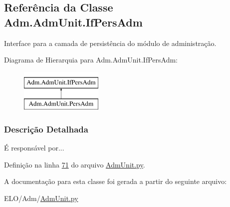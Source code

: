 \hypertarget{classAdm_1_1AdmUnit_1_1IfPersAdm}{\subsection{Referência da Classe Adm.\-Adm\-Unit.\-If\-Pers\-Adm}
\label{classAdm_1_1AdmUnit_1_1IfPersAdm}
}


Interface para a camada de persistência do módulo de administração.  


Diagrama de Hierarquia para Adm.\-Adm\-Unit.\-If\-Pers\-Adm\-:\begin{figure}[H]
\begin{center}
\leavevmode
\includegraphics[height=2.000000cm]{d0/dce/classAdm_1_1AdmUnit_1_1IfPersAdm}
\end{center}
\end{figure}


\subsubsection{Descrição Detalhada}
É responsável por... 

Definição na linha \hyperlink{AdmUnit_8py_source_l00071}{71} do arquivo \hyperlink{AdmUnit_8py_source}{Adm\-Unit.\-py}.



A documentação para esta classe foi gerada a partir do seguinte arquivo\-:\begin{DoxyCompactItemize}
\item 
E\-L\-O/\-Adm/\hyperlink{AdmUnit_8py}{Adm\-Unit.\-py}\end{DoxyCompactItemize}
